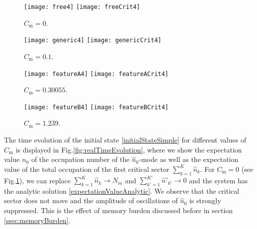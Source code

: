 \documentclass[aps,prd,reprint,superscriptaddress,nofootinbib]{revtex4-2}
\makeatletter
\newcommand*{\fig}{Fig.\@\xspace}
\makeatother
\begin{document}
\begin{figure*}
	\begin{subfigure}{0.4\textwidth}
		\texttt{[image: free4]}
		\hspace{0.18em} 
		\texttt{[image: freeCrit4]}
		\caption{$C_{\text{m}} = 0$.} 
			\label{sfig:freeEvolution}
	\end{subfigure}
	\hspace{0.05\textwidth}
	\vspace{40pt}
	\begin{subfigure}{0.4\textwidth}
		\texttt{[image: generic4]}	
		\hspace{0.18em} 
		\texttt{[image: genericCrit4]}
		\caption{$C_{\text{m}} = 0.1$.} 
		\label{sfig:genericEvolution}
	\end{subfigure}
	\begin{subfigure}{0.4\textwidth}
		\texttt{[image: featureA4]}
		\hspace{0.18em} 
		\texttt{[image: featureACrit4]}
		\caption{$C_{\text{m}} = 0.30055$. 
		} 
		\label{sfig:featureAEvolution}
	\end{subfigure}
	\hspace{0.05\textwidth}
	\begin{subfigure}{0.4\textwidth}
		\texttt{[image: featureB4]}
		\hspace{0.18em} 
		\texttt{[image: featureBCrit4]}
		\caption{$C_{\text{m}} = 1.239$.} 
		\label{sfig:featureBEvolution}
	\end{subfigure}
	\caption{Time evolution of the initial state \eqref{initialStateSimple} for different values of $C_{\text{m}}$. Oscillations on a timescale of order $1$ cannot be resolved graphically any more since we show very long timescales. $n_0$ is the expectation value of the occupation of the mode $\hat{a}_0$ and $\sum_k n_k$ that of the total occupation in the first critical sector. Time is plotted in units of $\epsilon_0^{-1} \hbar$.}
	\label{fig:realTimeEvolution}
\end{figure*}


The time evolution of the initial state \eqref{initialStateSimple} for different values of $C_{\text{m}}$ is displayed in \fig \ref{fig:realTimeEvolution}, where we show the expectation value $n_0$ of the occupation number of the $\hat{n}_0$-mode as well as the expectation value of the total 
occupation of the first critical sector $\sum_{k=1}^K \hat{n}_k$. 
For $C_{\text{m}}=0$ (see \fig \ref{sfig:freeEvolution}), 
we can replace $\sum_{k =1}^{K}  \hat{n}_k \rightarrow N_m$ and $\sum_{k' =1}^{K'}  \hat{n}'_{k'} \rightarrow 0$ and the system has the analytic solution \eqref{expectationValueAnalytic}. We observe that the critical sector does not move and the amplitude of oscillations of $\hat{n}_0$ is strongly suppressed. 
This is the effect of memory burden \cite{1810.02336} discussed before in 
section \ref{ssec:memoryBurden}.
\end{document}
